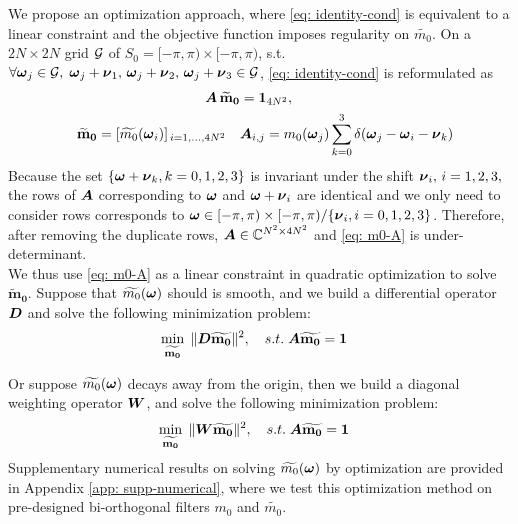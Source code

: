 We propose an optimization approach, where \eqref{eq: identity-cond} is equivalent to a linear constraint and the objective function imposes regularity on $\widetilde{m_0}$.
On a $2N\times 2N$ grid $\mathcal{G}$ of $S_0 = [-\pi, \pi)\times[-\pi, \pi)$, s.t. $\forall \boldsymbol{\omega}_j \in \mathcal{G}, \; \boldsymbol{\omega}_j+\boldsymbol{\nu}_1,\,\boldsymbol{\omega}_j+\boldsymbol{\nu}_2,\,\boldsymbol{\omega}_j+\boldsymbol{\nu}_3 \in \mathcal{G}$, \eqref{eq: identity-cond} is reformulated as
\begin{align}
\hspace*{10em} \V{A}\, \mathbf{\widetilde{m}_0}&= \mathbf{1}_{4N^2}, \label{eq: m0-A}\\ 
\mathbf{\widetilde{m}_0} = [\widetilde{m_0}(\V{\omega}_i)]_{\,i=1,\hdots,4N^2} \quad &\V{A}_{i,j} = m_0(\V{\omega}_j)\sum_{k=0}^3\delta(\V{\omega}_j-\V{\omega}_i-\V{\nu}_k) \notag
\end{align}
Because the set $\{\boldsymbol{\omega}+\boldsymbol{\nu}_k,k=0,1,2,3\}$ is invariant under the shift $\boldsymbol{\nu}_i,\, i = 1,2,3,$ the rows of $\boldsymbol{A}$ corresponding to $\boldsymbol{\omega}$ and $\boldsymbol{\omega}+\boldsymbol{\nu}_i$ are identical and we only need to consider rows corresponds to $\boldsymbol{\omega}\in [-\pi,\pi)\times[-\pi,\pi)/\{\boldsymbol{\nu}_i,i=0,1,2,3\}$. Therefore, after removing the duplicate rows, $\boldsymbol{A}\in \mathbb{C}^{N^2\times 4N^2}$ and \eqref{eq: m0-A} is under-determinant. \\
We thus use \eqref{eq: m0-A} as a linear constraint in quadratic optimization to solve $\mathbf{\widetilde{m}_0}$. Suppose that $\widetilde{m_{0}}(\boldsymbol{\omega})$ should is smooth, and we build a differential operator $\boldsymbol{D}$ and solve the following minimization problem:
\begin{align}
&\min_{\mathbf{\widetilde{m_{0}}}}\; \Vert \boldsymbol{D}\mathbf{\widetilde{m_{0}}}\Vert^2,\quad s.t. \; \boldsymbol{A}\mathbf{\widetilde{m_{0}}} = \mathbf{1} \label{eq: opt-diff}
\end{align}

Or suppose $\widetilde{m_{0}}(\boldsymbol{\omega})$ decays away from the origin, then we build a diagonal weighting operator $\boldsymbol{W}$, and solve the following minimization problem:
\begin{align}\label{eq: opt-weight}
&\min_{\mathbf{\widetilde{m_{0}}}}\; \Vert \boldsymbol{W}\mathbf{\widetilde{m_{0}}}\Vert^2,\quad s.t. \; \boldsymbol{A}\mathbf{\widetilde{m_{0}}} = \mathbf{1}
\end{align}
Supplementary numerical results on solving $\widetilde{m_{0}}(\boldsymbol{\omega})$ by optimization are provided in Appendix \ref{app: supp-numerical}, where we test this optimization method on pre-designed bi-orthogonal filters $m_0$ and $\widetilde{m_0}$.

